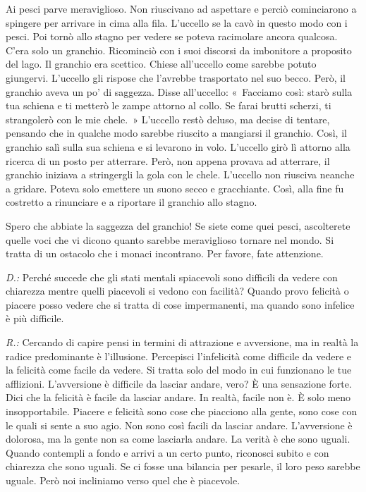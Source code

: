 Ai pesci parve meraviglioso. Non riuscivano ad aspettare e perciò
cominciarono a spingere per arrivare in cima alla fila. L'uccello se la
cavò in questo modo con i pesci. Poi tornò allo stagno per vedere se
poteva racimolare ancora qualcosa. C'era solo un granchio. Ricominciò
con i suoi discorsi da imbonitore a proposito del lago. Il granchio era
scettico. Chiese all'uccello come sarebbe potuto giungervi. L'uccello
gli rispose che l'avrebbe trasportato nel suo becco. Però, il granchio
aveva un po' di saggezza. Disse all'uccello: «~Facciamo così: starò
sulla tua schiena e ti metterò le zampe attorno al collo. Se farai
brutti scherzi, ti strangolerò con le mie chele.~» L'uccello restò
deluso, ma decise di tentare, pensando che in qualche modo sarebbe
riuscito a mangiarsi il granchio. Così, il granchio salì sulla sua
schiena e si levarono in volo. L'uccello girò lì attorno alla ricerca di
un posto per atterrare. Però, non appena provava ad atterrare, il
granchio iniziava a stringergli la gola con le chele. L'uccello non
riusciva neanche a gridare. Poteva solo emettere un suono secco e
gracchiante. Così, alla fine fu costretto a rinunciare e a riportare il
granchio allo stagno.

Spero che abbiate la saggezza del granchio! Se siete come quei pesci,
ascolterete quelle voci che vi dicono quanto sarebbe meraviglioso
tornare nel mondo. Si tratta di un ostacolo che i monaci incontrano. Per
favore, fate attenzione.

\emph{D.:} Perché succede che gli stati mentali spiacevoli sono difficili da
vedere con chiarezza mentre quelli piacevoli si vedono con facilità?
Quando provo felicità o piacere posso vedere che si tratta di cose
impermanenti, ma quando sono infelice è più difficile.

\emph{R.:} Cercando di capire pensi in termini di attrazione e avversione, ma
in realtà la radice predominante è l'illusione. Percepisci l'infelicità
come difficile da vedere e la felicità come facile da vedere. Si tratta
solo del modo in cui funzionano le tue afflizioni. L'avversione è
difficile da lasciar andare, vero? È una sensazione forte. Dici che la
felicità è facile da lasciar andare. In realtà, facile non è. È solo
meno insopportabile. Piacere e felicità sono cose che piacciono alla
gente, sono cose con le quali si sente a suo agio. Non sono così facili
da lasciar andare. L'avversione è dolorosa, ma la gente non sa come
lasciarla andare. La verità è che sono uguali. Quando contempli a fondo
e arrivi a un certo punto, riconosci subito e con chiarezza che sono
uguali. Se ci fosse una bilancia per pesarle, il loro peso sarebbe
uguale. Però noi incliniamo verso quel che è piacevole.

